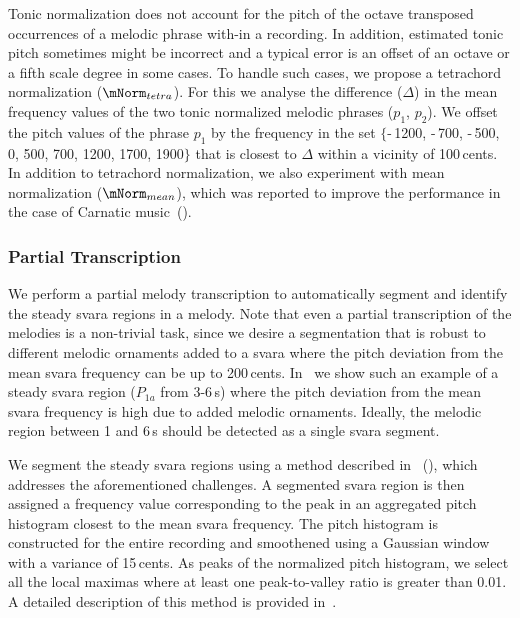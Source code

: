 Tonic normalization does not account for the pitch of the octave transposed occurrences of a melodic phrase with-in a recording. In addition, estimated tonic pitch sometimes might be incorrect and a typical error is an offset of an octave or a fifth scale degree in some cases. To handle such cases, we propose a tetrachord normalization ($\mNorm_{tetra}$). For this we analyse the difference ($\Delta$) in the mean frequency values of the two tonic normalized melodic phrases ($p_1$, $p_2$). We offset the pitch values of the phrase $p_1$ by the frequency in the set $\lbrace$-\,1200, -\,700, -\,500, 0, 500, 700, 1200, 1700, 1900$\rbrace$ that is closest to $\Delta$ within a vicinity of 100\,cents. In addition to tetrachord normalization, we also experiment with mean normalization ($\mNorm_{mean}$), which was reported to improve the performance in the case of Carnatic music~(). 


\subsubsection{Partial Transcription}
\label{sec:patterns_improving_similarity_partial_transcription}

We perform a partial melody transcription to automatically segment and identify the steady \gls{svara} regions in a melody. Note that even a partial transcription of the melodies is a non-trivial task, since we desire a segmentation that is robust to different melodic ornaments added to a \gls{svara} where the pitch deviation from the mean \gls{svara} frequency can be up to 200\,cents. In~ we show such an example of a steady \gls{svara} region ($P_{1a}$ from 3-6\,s) where the pitch deviation from the mean \gls{svara} frequency is high due to added melodic ornaments. Ideally, the melodic region between 1 and 6\,s should be detected as a single \gls{svara} segment.

We segment the steady \gls{svara} regions using a method described in~\cite{gulati2014Landmark} (), which addresses the aforementioned challenges. A segmented \gls{svara} region is then assigned a frequency value corresponding to the peak in an aggregated pitch histogram closest to the mean \gls{svara} frequency. The pitch histogram is constructed for the entire recording and smoothened using a Gaussian window with a variance of 15\,cents. As peaks of the normalized pitch histogram, we select all the local maximas where at least one peak-to-valley ratio is greater than 0.01. A detailed description of this method is provided in~.
 
